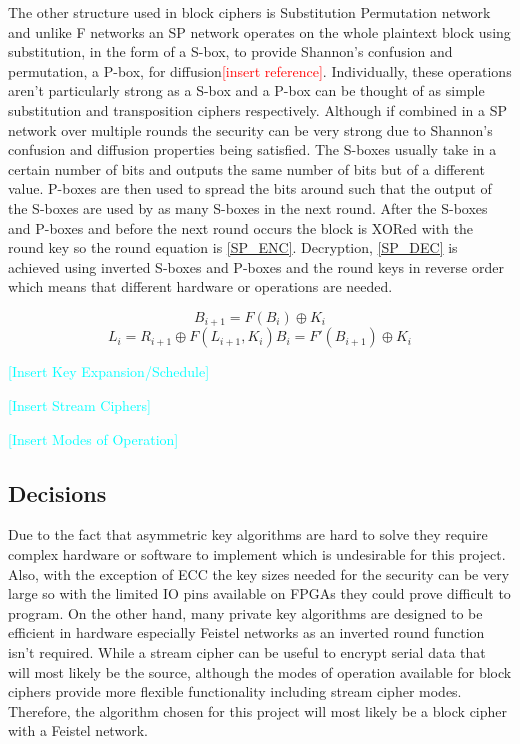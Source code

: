 \documentclass[12pt,twoside,a4paper]{report}
\begin{document}
    The other structure used in block ciphers is Substitution Permutation network and unlike F networks an SP network operates on the whole plaintext block using substitution, in the form of a S-box, to provide Shannon's confusion and permutation, a P-box, for diffusion\textcolor{red}{[insert reference]}. Individually, these operations aren't particularly strong as a S-box and a P-box can be thought of as simple substitution and transposition ciphers respectively. Although if combined in a SP network over multiple rounds the security can be very strong due to Shannon's confusion and diffusion properties being satisfied. The S-boxes usually take in a certain number of bits and outputs the same number of bits but of a different value. P-boxes are then used to spread the bits around such that the output of the S-boxes are used by as many S-boxes in the next round. After the S-boxes and P-boxes and before the next round occurs the block is XORed with the round key so the round equation is \autoref{SP_ENC}. Decryption, \autoref{SP_DEC} is achieved using inverted S-boxes and P-boxes and the round keys in reverse order which means that different hardware or operations are needed.
    
    \begin{equation}
    \label{SP_ENC}
    B_{i+1} = F(B_i) \oplus K_i
    \end{equation}
    \begin{equation}
    \label{SP_DEC}
    L_i = R_{i+1} \oplus F(L_{i+1}, K_i)B_i = F'(B_{i+1}) \oplus K_i
    \end{equation}
    
    \textcolor{cyan}{[Insert Key Expansion/Schedule]}
    
    \textcolor{cyan}{[Insert Stream Ciphers]}
    
    \textcolor{cyan}{[Insert Modes of Operation]}
    
    \subsection{Decisions}
    Due to the fact that asymmetric key algorithms are hard to solve they require complex hardware or software to implement which is undesirable for this project. Also, with the exception of ECC the key sizes needed for the security can be very large so with the limited IO pins available on FPGAs they could prove difficult to program. On the other hand, many private key algorithms are designed to be efficient in hardware especially Feistel networks as an inverted round function isn't required. While a stream cipher can be useful to encrypt serial data that will most likely be the source, although the modes of operation available for block ciphers provide more flexible functionality including stream cipher modes. Therefore, the algorithm chosen for this project will most likely be a block cipher with a Feistel network.
    
\end{document}
